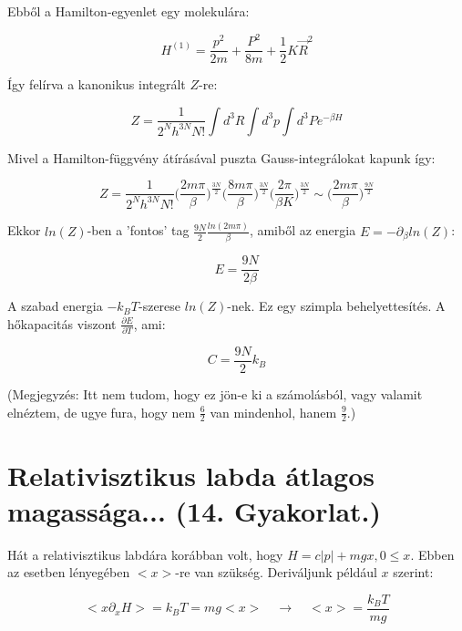 \documentclass[a4paper,12pt]{article}
\begin{document}
\par Ebből a Hamilton-egyenlet egy molekulára:

\begin{equation*}
H^{(1)} = \frac{p^{2}}{2m} + \frac{P^{2}}{8m} + \frac{1}{2}K\vec{R}^{2}
\end{equation*}

\par Így felírva a kanonikus integrált $Z$-re:

\begin{equation*}
Z = \frac{1}{2^{N}h^{3N}N!}\int d^{3}R \int d^{3}p\int d^{3}Pe^{-\beta H}
\end{equation*}

\par Mivel a Hamilton-függvény átírásával puszta Gauss-integrálokat kapunk így:

\begin{equation*}
Z = \frac{1}{2^{N}h^{3N}N!} \Big(\frac{2m\pi}{\beta}\Big)^{\frac{3N}{2}} \Big(\frac{8m\pi}{\beta}\Big)^{\frac{3N}{2}} \Big(\frac{2\pi}{\beta K}\Big)^{\frac{3N}{2}} \sim \Big(\frac{2m\pi}{\beta}\Big)^{\frac{9N}{2}}
\end{equation*}

\par Ekkor $ln(Z)$-ben a 'fontos' tag $\frac{9N}{2}\frac{ln(2m\pi)}{\beta}$, amiből az energia $E = -\partial_{\beta}ln(Z)$:

\begin{equation}
E = \frac{9N}{2\beta}
\end{equation}

\par A szabad energia $-k_{B}T$-szerese $ln(Z)$-nek. Ez egy szimpla behelyettesítés. A hőkapacitás viszont $\frac{\partial E}{\partial T}$, ami:

\begin{equation}
C = \frac{9N}{2}k_{B}
\end{equation}

\par (Megjegyzés: Itt nem tudom, hogy ez jön-e ki a számolásból, vagy valamit elnéztem, de ugye fura, hogy nem $\frac{6}{2}$ van mindenhol, hanem $\frac{9}{2}$.)

\section{Relativisztikus labda átlagos magassága... (14. Gyakorlat.)}

\par Hát a relativisztikus labdára korábban volt, hogy $H = c|p| + mgx, 0 \leq x$. Ebben az esetben lényegében $<x>$-re van szükség. Deriváljunk például $x$ szerint:

\begin{equation}
<x\partial_{x}H> = k_{B}T = mg<x> \quad \rightarrow \quad <x> = \frac{k_{B}T}{mg}
\end{equation}
\end{document}
